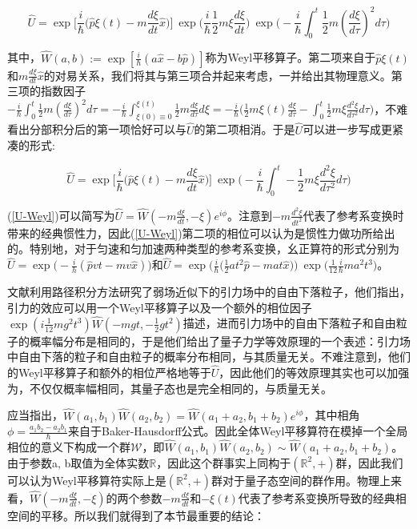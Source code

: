 \documentclass[a4paper]{article}
\begin{document}
        \begin{equation}
            \hat{U}=\exp\bigg[\frac{i}{\hbar}\bigg(\hat{p}\xi(t)-m\frac{d\xi}{dt}\hat{x} \bigg) \bigg]\ \exp\bigg(\frac{i}{\hbar}\frac{1}{2}m\xi\frac{d\xi}{dt} \bigg)\ \exp\bigg(-\frac{i}{\hbar}\int_0^t\frac{1}{2}m(\frac{d \xi}{d\tau})^2 d\tau \bigg)
        \end{equation}

        其中，$\hat{W}(a,b):=\exp[\frac{i}{\hbar}(a\hat{x}-b\hat{p})]$称为Weyl平移算子。第二项来自于$\hat{p}\xi(t)$和$m\frac{d\xi}{dt}\hat{x}$的对易关系，我们将其与第三项合并起来考虑，一并给出其物理意义。第三项的指数因子$-\frac{i}{\hbar}\int_0^t\frac{1}{2}m(\frac{d \xi}{d\tau})^2 d\tau = -\frac{i}{\hbar}\int_{\xi(0)\equiv 0}^{\xi(t)}\frac{1}{2}m\frac{d \xi}{d\tau} d\xi = -\frac{i}{\hbar}\bigg(\frac{1}{2}m\xi(t)\frac{d \xi}{d\tau}-\int_0^t\frac{1}{2}m\xi\frac{d^2\xi}{d\tau^2} d\tau\bigg)$，不难看出分部积分后的第一项恰好可以与$\hat{U}$的第二项相消。于是$\hat{U}$可以进一步写成更紧凑的形式:

        \begin{equation}\label{U-Weyl}
            \hat{U} = \exp\bigg[\frac{i}{\hbar}\bigg(\hat{p}\xi(t)-m\frac{d\xi}{dt}\hat{x} \bigg) \bigg]\ \exp\bigg( -\frac{i}{\hbar}\int_0^t-\frac{1}{2}m\xi\frac{d^2\xi}{d\tau^2} d\tau\bigg)
        \end{equation}

        (\ref{U-Weyl})可以简写为$\hat{U}=\hat{W}(-m\frac{d\xi}{dt},-\xi)e^{i\phi}$。注意到$-m\frac{d^2\xi}{dt^2}$代表了参考系变换时带来的经典惯性力，因此(\ref{U-Weyl})第二项的相位可以认为是惯性力做功所给出的。特别地，对于匀速和匀加速两种类型的参考系变换，幺正算符的形式分别为$\hat{U}=\exp\big(-\frac{i}{h}(\hat{p}vt-mv\hat{x})\big)$和$\hat{U}=\exp\big(\frac{i}{\hbar}\big(\frac{1}{2}at^2\hat{p}-mat\hat{x} \big)\big)\ \exp\big(\frac{1}{12}\frac{i}{\hbar}ma^2t^3\big)$。
        
        文献\cite{bib:nine}利用路径积分方法研究了弱场近似下的引力场中的自由下落粒子，他们指出，引力的效应可以用一个Weyl平移算子以及一个额外的相位因子$\exp(i\frac{1}{12}mg^2t^3)\hat{W}(-mgt,-\frac{1}{2}gt^2)$描述，进而引力场中的自由下落粒子和自由粒子的概率幅分布是相同的，于是他们给出了量子力学等效原理的一个表述：引力场中自由下落的粒子和自由粒子的概率分布相同，与其质量无关。不难注意到，他们的Weyl平移算子和额外的相位严格地等于$\hat{U}$，因此他们的等效原理其实也可以加强为，不仅仅概率幅相同，其量子态也是完全相同的，与质量无关。

        应当指出，$\hat{W}(a_1, b_1)\hat{W}(a_2, b_2)=\hat{W}(a_1+a_2, b_1+b_2)e^{i\phi}$，其中相角$\phi=\frac{a_1b_2-a_2b_1}{\hbar}$来自于Baker-Hausdorff公式。因此全体Weyl平移算符在模掉一个全局相位的意义下构成一个群$\mathcal{W}$，即$\hat{W}(a_1, b_1)\hat{W}(a_2, b_2)\sim\hat{W}(a_1+a_2, b_1+b_2)$。由于参数a, b取值为全体实数$\mathbb{R}$，因此这个群事实上同构于$(\mathbb{R}^2,+)$群，因此我们可以认为Weyl平移算符实际上是$(\mathbb{R}^2,+)$群对于量子态空间的群作用。物理上来看，$\hat{W}(-m\frac{d\xi}{dt}, -\xi)$的两个参数$-m\frac{d\xi}{dt}$和$-\xi(t)$代表了参考系变换所导致的经典相空间的平移。所以我们就得到了本节最重要的结论：
\end{document}

